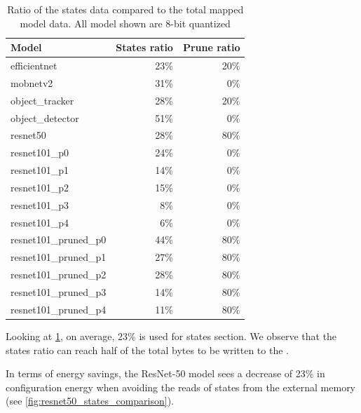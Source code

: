 \begin{table}[hbtp]
\centering
\begin{tabular}{@{}lrr@{}}
\toprule
\textbf{Model}          & \textbf{States ratio} & \textbf{Prune ratio} \\ \midrule
efficientnet            & 23\%                  & 20\%                 \\
mobnetv2                & 31\%                  & 0\%                  \\
object\_tracker         & 28\%                  & 20\%                 \\
object\_detector        & 51\%                  & 0\%                  \\
resnet50                & 28\%                  & 80\%                 \\
resnet101\_p0           & 24\%                  & 0\%                  \\
resnet101\_p1           & 14\%                  & 0\%                  \\
resnet101\_p2           & 15\%                  & 0\%                  \\
resnet101\_p3           & 8\%                   & 0\%                  \\
resnet101\_p4           & 6\%                   & 0\%                  \\
resnet101\_pruned\_p0   & 44\%                  & 80\%                 \\
resnet101\_pruned\_p1   & 27\%                  & 80\%                 \\
resnet101\_pruned\_p2   & 28\%                  & 80\%                 \\
resnet101\_pruned\_p3   & 14\%                  & 80\%                 \\
resnet101\_pruned\_p4   & 11\%                  & 80\%                 \\ \bottomrule
\end{tabular}
\caption{
    Ratio of the states data compared to the total mapped model data.
    All model shown are 8-bit quantized
}
\label{tab:states_ratio}
\end{table}

Looking at \cref{tab:states_ratio}, on average, $23\%$ is used for states section.
We observe that the states ratio can reach half of the total bytes to be written to the \graicore{}.

In terms of energy savings, the ResNet-50 model sees a decrease of 23\% in configuration energy when avoiding the reads of states from the external memory (see \cref{fig:resnet50_states_comparison}).

